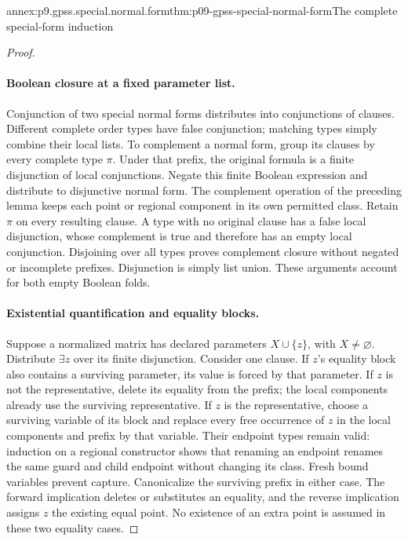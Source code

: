 \begin{annexitem}{annex:p9.gpss.special.normal.form}{thm:p09-gpss-special-normal-form}{The complete special-form induction}
\begin{proof}
\paragraph{Boolean closure at a fixed parameter list.}
Conjunction of two special normal forms distributes into
conjunctions of clauses. Different complete order types have
false conjunction; matching types simply combine their local
lists. To complement a normal form, group its clauses by every
complete type \(\pi\). Under that prefix, the original
formula is a finite disjunction of local conjunctions. Negate
this finite Boolean expression and distribute to disjunctive
normal form. The complement operation of the preceding lemma
keeps each point or regional component in its own permitted
class. Retain \(\pi\) on every resulting clause. A type
with no original clause has a false local disjunction, whose
complement is true and therefore has an empty local conjunction.
Disjoining over all types proves complement closure without
negated or incomplete prefixes. Disjunction is simply list union.
These arguments account for both empty Boolean folds.

\paragraph{Existential quantification and equality blocks.}
Suppose a normalized matrix has declared parameters
\(X\cup\{z\}\), with \(X\ne\varnothing\).
Distribute \(\exists z\) over its finite disjunction.
Consider one clause. If \(z\)'s equality block also
contains a surviving parameter, its value is forced by that
parameter. If \(z\) is not the representative, delete its
equality from the prefix; the local components already use
the surviving representative. If \(z\) is the representative,
choose a surviving variable of its block and replace every
free occurrence of \(z\) in the local components and prefix
by that variable. Their endpoint types remain valid: induction
on a regional constructor shows that renaming an endpoint
renames the same guard and child endpoint without changing
its class. Fresh bound variables prevent capture. Canonicalize
the surviving prefix in either case. The forward implication
deletes or substitutes an equality, and the reverse implication
assigns \(z\) the existing equal point. No existence of an
extra point is assumed in these two equality cases.


\end{proof}
\end{annexitem}
